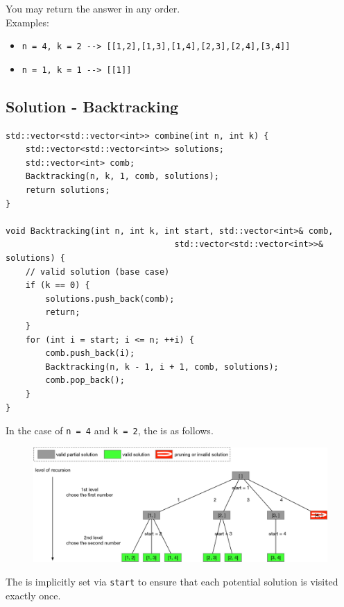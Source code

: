 You may return the answer in any order. \\

Examples:
\begin{itemize}
	\item {\colorbox{CodeBackground}{\lstinline|n = 4, k = 2 --> [[1,2],[1,3],[1,4],[2,3],[2,4],[3,4]]|}}
	\item {\colorbox{CodeBackground}{\lstinline|n = 1, k = 1 --> [[1]]|}}
\end{itemize}

\subsection*{Solution - Backtracking}
\begin{lstlisting}
std::vector<std::vector<int>> combine(int n, int k) {
	std::vector<std::vector<int>> solutions;
	std::vector<int> comb;
	Backtracking(n, k, 1, comb, solutions);
	return solutions;
}

void Backtracking(int n, int k, int start, std::vector<int>& comb,
								  std::vector<std::vector<int>>& solutions) {
	// valid solution (base case)
	if (k == 0) {
		solutions.push_back(comb);
		return;
	}
	for (int i = start; i <= n; ++i) {
		comb.push_back(i);
		Backtracking(n, k - 1, i + 1, comb, solutions);
		comb.pop_back();
	}
}

\end{lstlisting}\mbox{}

In the case of {\colorbox{CodeBackground}{\lstinline|n = 4|}} and {\colorbox{CodeBackground}{\lstinline|k = 2|}}, the {\color{blue}{potential search tree}} is as follows. 

\begin{figure}[H]
	\centering
	\includegraphics[width=1.0\linewidth]{images/lc0077_pst}
	\label{fig:lc0077pst}
\end{figure}

The {\color{blue}{search order}} is implicitly set via {\colorbox{CodeBackground}{\lstinline|start|}} to ensure that each potential solution is visited exactly once.

